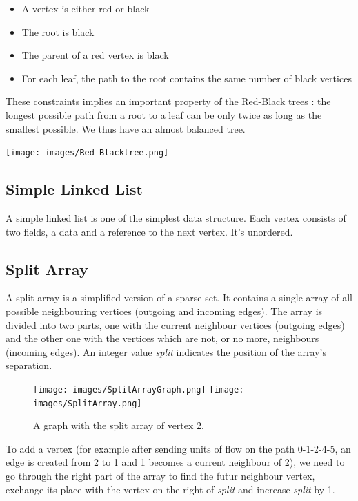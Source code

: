 \begin{itemize}
\item A vertex is either red or black
\item The root is black
\item The parent of a red vertex is black
\item For each leaf, the path to the root contains the same number of black vertices
\end{itemize}

These constraints implies an important property of the Red-Black trees : the longest possible path from a root to a leaf can be only twice as long as the smallest possible. We thus have an almost balanced tree.

\begin{center}
\texttt{[image: images/Red-Blacktree.png]}
\end{center}

\subsection{Simple Linked List}
A simple linked list is one of the simplest data structure. Each vertex consists of two fields, a data and a reference to the next vertex. It's unordered.


\subsection{Split Array}
A split array is a simplified version of a sparse set. It contains a single array of all possible neighbouring vertices (outgoing and incoming edges). The array is divided into two parts, one with the current neighbour vertices (outgoing edges) and the other one with the vertices which are not, or no more, neighbours (incoming edges). An integer value \textit{split} indicates the position of the array's separation.

\begin{figure}[!h]
\texttt{[image: images/SplitArrayGraph.png]}\hfill
\texttt{[image: images/SplitArray.png]} %
\caption{A graph with the split array of vertex 2.}
\end{figure}

To add a vertex (for example after sending units of flow on the path 0-1-2-4-5, an edge is created from 2 to 1 and 1 becomes a current neighbour of 2), we need to go through the right part of the array to find the futur neighbour vertex, exchange its place with the vertex on the right of \textit{split} and increase \textit{split} by 1. \newline

